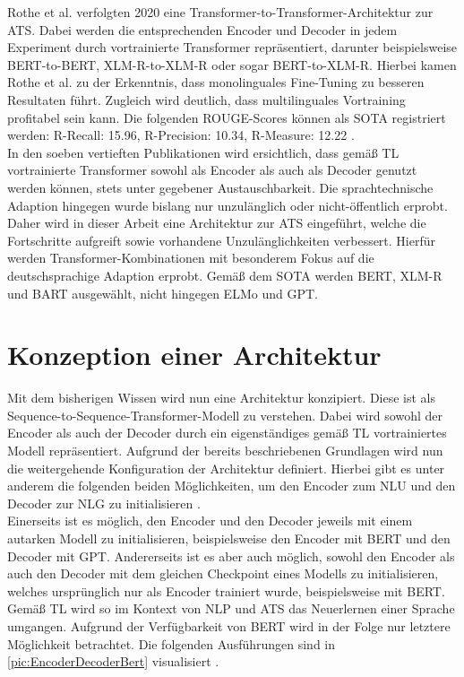 \noindent
Rothe et al. verfolgten 2020 eine Transformer-to-Transformer-Architektur zur \ac{ATS}. Dabei werden die entsprechenden Encoder und Decoder in jedem Experiment durch vortrainierte Transformer repräsentiert, darunter beispielsweise \ac{BERT}-to-\ac{BERT}, \ac{XLM-R}-to-\ac{XLM-R} oder sogar \ac{BERT}-to-\ac{XLM-R}. Hierbei kamen Rothe et al. zu der Erkenntnis, dass monolinguales Fine-Tuning zu besseren Resultaten führt. Zugleich wird deutlich, dass multilinguales Vortraining profitabel sein kann. Die folgenden \ac{ROUGE}-Scores können als \ac{SOTA} registriert werden: R-Recall: 15.96, R-Precision: 10.34, R-Measure: 12.22 \cite{ROT20}.\\

\noindent
In den soeben vertieften Publikationen wird ersichtlich, dass gemäß \ac{TL} vortrainierte Transformer sowohl als Encoder als auch als Decoder genutzt werden können, stets unter gegebener Austauschbarkeit. Die sprachtechnische Adaption hingegen wurde bislang nur unzulänglich oder nicht-öffentlich erprobt. Daher wird in dieser Arbeit eine Architektur zur \ac{ATS} eingeführt, welche die Fortschritte aufgreift sowie vorhandene Unzulänglichkeiten verbessert. Hierfür werden Transformer-Kombinationen mit besonderem Fokus auf die deutschsprachige Adaption erprobt. Gemäß dem \ac{SOTA} werden \ac{BERT}, \ac{XLM-R} und \ac{BART} ausgewählt, nicht hingegen \ac{ELMo} und \ac{GPT}.


\section{Konzeption einer Architektur}
\noindent
Mit dem bisherigen Wissen wird nun eine Architektur konzipiert. Diese ist als Sequence-to-Sequence-Transformer-Modell zu verstehen. Dabei wird sowohl der Encoder als auch der Decoder durch ein eigenständiges gemäß \ac{TL} vortrainiertes Modell repräsentiert. Aufgrund der bereits beschriebenen Grundlagen wird nun die weitergehende Konfiguration der Architektur definiert. Hierbei gibt es unter anderem die folgenden beiden Möglichkeiten, um den Encoder zum \ac{NLU} und den Decoder zur \ac{NLG} zu initialisieren \cite[S.~2]{ROT20}.\\

\noindent
Einerseits ist es möglich, den Encoder und den Decoder jeweils mit einem autarken Modell zu initialisieren, beispielsweise den Encoder mit \ac{BERT} und den Decoder mit \ac{GPT}. Andererseits ist es aber auch möglich, sowohl den Encoder als auch den Decoder mit dem gleichen Checkpoint eines Modells zu initialisieren, welches ursprünglich nur als Encoder trainiert wurde, beispielsweise mit \ac{BERT}. Gemäß \ac{TL} wird so im Kontext von \ac{NLP} und \ac{ATS} das Neuerlernen einer Sprache umgangen. Aufgrund der Verfügbarkeit von \ac{BERT} wird in der Folge nur letztere Möglichkeit betrachtet. Die folgenden Ausführungen sind in \autoref{pic:EncoderDecoderBert} visualisiert \cite[S.~2-3]{ROT20}.\\

